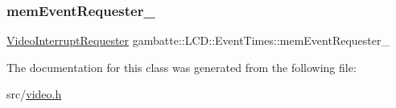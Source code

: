 \subsubsection{\texorpdfstring{mem\+Event\+Requester\+\_\+}{memEventRequester\_}}
{\footnotesize\ttfamily \hyperlink{classgambatte_1_1VideoInterruptRequester}{Video\+Interrupt\+Requester} gambatte\+::\+L\+C\+D\+::\+Event\+Times\+::mem\+Event\+Requester\+\_\+\hspace{0.3cm}{\ttfamily [private]}}



The documentation for this class was generated from the following file\+:\begin{DoxyCompactItemize}
\item 
src/\hyperlink{video_8h}{video.\+h}\end{DoxyCompactItemize}
